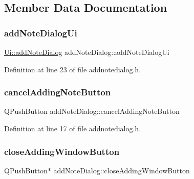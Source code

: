 \subsection{Member Data Documentation}
\hypertarget{classaddNoteDialog_a4fd2dea6a480150e92f58bc0d415a83e}{}\label{classaddNoteDialog_a4fd2dea6a480150e92f58bc0d415a83e} 
\subsubsection{\texorpdfstring{add\+Note\+Dialog\+Ui}{addNoteDialogUi}}
{\footnotesize\ttfamily \hyperlink{classUi_1_1addNoteDialog}{Ui\+::add\+Note\+Dialog} add\+Note\+Dialog\+::add\+Note\+Dialog\+Ui\hspace{0.3cm}{\ttfamily [private]}}



Definition at line 23 of file addnotedialog.\+h.

\hypertarget{classaddNoteDialog_a05ecc54eb7cba0d6ffbc5cabc8a4f551}{}\label{classaddNoteDialog_a05ecc54eb7cba0d6ffbc5cabc8a4f551} 
\subsubsection{\texorpdfstring{cancel\+Adding\+Note\+Button}{cancelAddingNoteButton}}
{\footnotesize\ttfamily Q\+Push\+Button add\+Note\+Dialog\+::cancel\+Adding\+Note\+Button}



Definition at line 17 of file addnotedialog.\+h.

\hypertarget{classaddNoteDialog_af1d9adf48985dc8ca2ec30c60c3d569e}{}\label{classaddNoteDialog_af1d9adf48985dc8ca2ec30c60c3d569e} 
\subsubsection{\texorpdfstring{close\+Adding\+Window\+Button}{closeAddingWindowButton}}
{\footnotesize\ttfamily Q\+Push\+Button$\ast$ add\+Note\+Dialog\+::close\+Adding\+Window\+Button}



